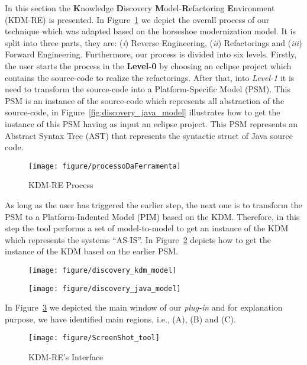 In this section the \textbf{K}nowledge \textbf{D}iscovery \textbf{M}odel-\textbf{R}efactoring \textbf{E}nvironment (KDM-RE) is presented. 
In Figure~\ref{fig:process} we depict the overall process of our technique which was adapted based on the horseshoe modernization model. 
It is split into three parts, they are: 
(\textit{i}) Reverse Engineering, 
(\textit{ii}) Refactorings and 
(\textit{iii}) Forward Engineering. 
Furthermore, our process is divided into six levels. 
Firstly, the user starts the process in the \textbf{Level-0} by choosing an eclipse project which contains the source-code to realize the refactorings.  
After that, into \textit{Level-1} it is need to transform the source-code into a Platform-Specific Model (PSM). 
This PSM is an instance of the source-code which represents all abstraction of the source-code, in Figure~\ref{fig:discovery_java_model} illustrates how to get the instance of this PSM having as input an eclipse project. 
This PSM represents an Abstract Syntax Tree (AST) that represents the syntactic struct of Java source code.

\begin{figure}[!ht]
\centering
  \texttt{[image: figure/processoDaFerramenta]}
\caption{KDM-RE Process}
\label{fig:process}
\end{figure} 

As long as the user has triggered the earlier step, the next one is to transform the PSM to a Platform-Indented Model (PIM) based on the KDM. 
Therefore, in this step the tool performs a set of model-to-model to get an instance of the KDM which represents the systems ``AS-IS''. 
In Figure~\ref{fig:discovery_kdm_model} depicts how to get the instance of the KDM based on the earlier PSM.

\begin{figure}
\centering
\begin{minipage}{.5\textwidth}
  \centering
  \texttt{[image: figure/discovery\_kdm\_model]}
  \label{fig:discovery_java_model}
\end{minipage}%
\begin{minipage}{.5\textwidth}
  \centering
  \texttt{[image: figure/discovery\_java\_model]}
  \label{fig:discovery_kdm_model}
\end{minipage}
\end{figure}

In Figure~\ref{fig:interface} we depicted the main window of our \textit{plug-in} and for explanation purpose, we have identified main regions, i.e., (A), (B) and (C).

\begin{figure}[!ht]
\centering
  \texttt{[image: figure/ScreenShot\_tool]}
\caption{KDM-RE's Interface}
\label{fig:interface}
\end{figure}